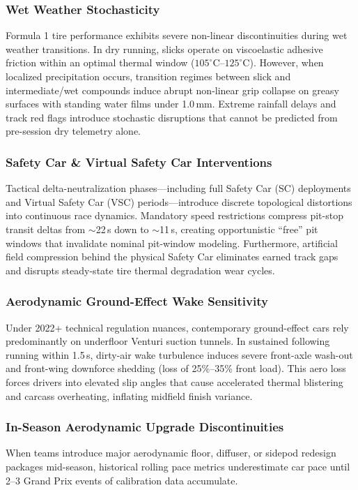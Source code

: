 \documentclass[journal]{IEEEtran}
\begin{document}
\subsubsection{Wet Weather Stochasticity}
Formula 1 tire performance exhibits severe non-linear discontinuities during wet weather transitions. In dry running, slicks operate on viscoelastic adhesive friction within an optimal thermal window ($105^\circ\text{C}$--$125^\circ\text{C}$). However, when localized precipitation occurs, transition regimes between slick and intermediate/wet compounds induce abrupt non-linear grip collapse on greasy surfaces with standing water films under 1.0\,mm. Extreme rainfall delays and track red flags introduce stochastic disruptions that cannot be predicted from pre-session dry telemetry alone.

\subsubsection{Safety Car \& Virtual Safety Car Interventions}
Tactical delta-neutralization phases---including full Safety Car (SC) deployments and Virtual Safety Car (VSC) periods---introduce discrete topological distortions into continuous race dynamics. Mandatory speed restrictions compress pit-stop transit deltas from $\sim$22\,s down to $\sim$11\,s, creating opportunistic ``free'' pit windows that invalidate nominal pit-window modeling. Furthermore, artificial field compression behind the physical Safety Car eliminates earned track gaps and disrupts steady-state tire thermal degradation wear cycles.

\subsubsection{Aerodynamic Ground-Effect Wake Sensitivity}
Under 2022+ technical regulation nuances, contemporary ground-effect cars rely predominantly on underfloor Venturi suction tunnels. In sustained following running within 1.5\,s, dirty-air wake turbulence induces severe front-axle wash-out and front-wing downforce shedding (loss of 25\%--35\% front load). This aero loss forces drivers into elevated slip angles that cause accelerated thermal blistering and carcass overheating, inflating midfield finish variance.

\subsubsection{In-Season Aerodynamic Upgrade Discontinuities}
When teams introduce major aerodynamic floor, diffuser, or sidepod redesign packages mid-season, historical rolling pace metrics underestimate car pace until 2--3 Grand Prix events of calibration data accumulate.
\end{document}
